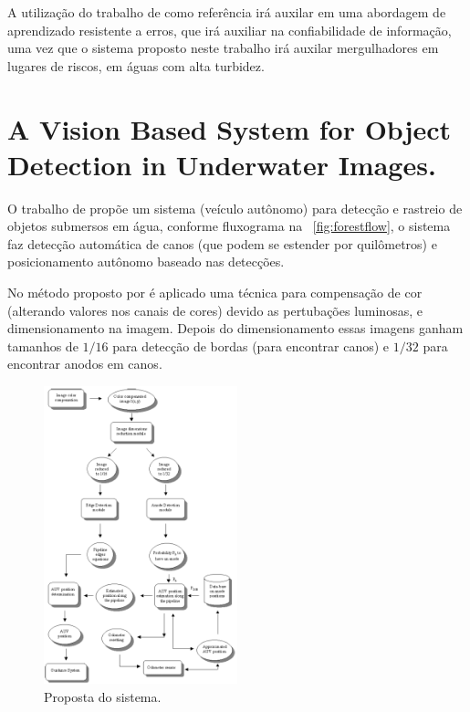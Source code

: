A utilização do trabalho de  como referência irá auxilar em uma abordagem de aprendizado resistente a erros, que irá auxiliar na confiabilidade de informação, uma vez que o sistema proposto neste trabalho irá auxilar mergulhadores em lugares de riscos, em águas com alta turbidez. 

\section{A Vision Based System for Object Detection in Underwater Images.}

O trabalho de  propõe um sistema (veículo autônomo) para detecção e rastreio de objetos submersos em água, conforme fluxograma na ~\autoref{fig:forestflow}, o sistema faz detecção automática de canos (que podem se estender por quilômetros) e posicionamento autônomo baseado nas detecções.

No método proposto por  é aplicado uma técnica para compensação de cor (alterando valores nos canais de cores) devido as pertubações luminosas, e dimensionamento na imagem. Depois do dimensionamento essas imagens ganham tamanhos de $1/16$ para detecção de bordas (para encontrar canos) e $1/32$ para encontrar anodos em canos.
\begin{figure}[h]
	\caption{\label{fig:forestflow}Proposta do sistema.}
	\begin{center}
	    \includegraphics[width=0.5\textwidth]{resources/flowchartforest}
	\end{center}
\end{figure}

